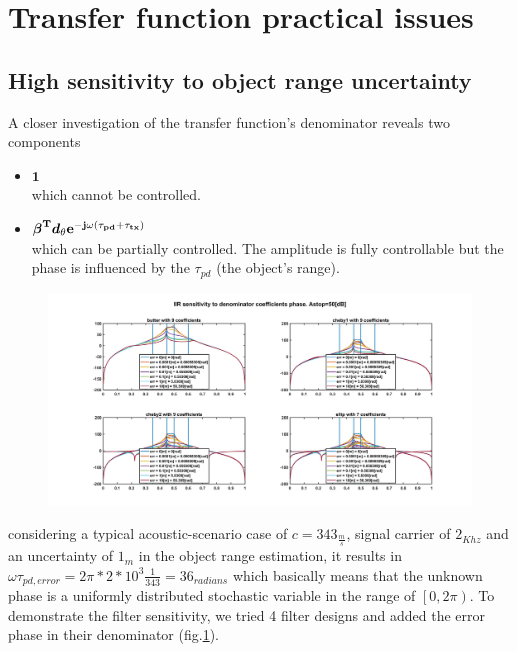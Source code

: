 \documentclass[12pt]{article}
\begin{document}
\section*{Transfer function practical issues}

\subsection*{High sensitivity to object range uncertainty}

A closer investigation of the transfer function's denominator reveals two components
\begin{itemize}
\item
{
$ \mathbf{ 1 } $
\\
which cannot be controlled.
}
\item
{
$
\mathbf{
\boldsymbol{\beta}^{T}\boldsymbol{d}_{\theta}e^{-j\omega (\tau_{pd}+\tau_{tx})} 
}
$
\\
which can be partially controlled. The amplitude is fully controllable but the phase is influenced by the $ \tau_{pd} $ (the object's range). 
}
\end{itemize}
\begin{figure}[!ht]
\begin{center}
\includegraphics[width=1\textwidth]{Media/filterSensitivitySim/filtSensitivity50dB.jpg}
\end{center}
\label{fig:filtPhaseSensitivity50dB}
\end{figure}
considering a typical acoustic-scenario case of $ c=343_{\frac{m}{s}} $, signal carrier of $ 2_{Khz} $ and an uncertainty of $ 1_{m} $ in the object range estimation, it results in $ \omega\tau_{pd,error} = 2\pi*2*10^{3}\frac{1}{343} = 36_{radians} $ which basically means that the unknown phase is a uniformly distributed stochastic variable in the range of $ \left[0, 2\pi\right) $. To demonstrate the filter sensitivity, we tried 4 filter designs and added the error phase in their denominator (fig.\ref{fig:filtPhaseSensitivity50dB}).
\end{document}

